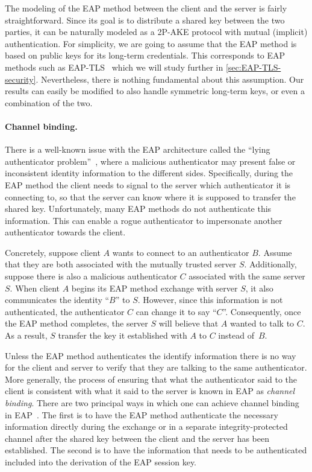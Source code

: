The modeling of the EAP method between the client and the server is fairly straightforward.
Since its goal is to distribute a shared key between the two parties,
it can be naturally modeled as a 2P-AKE protocol with mutual (implicit) authentication.
For simplicity,
we are going to assume that the EAP method is based on public keys for its long-term credentials.
This corresponds to EAP methods such as EAP-TLS~\cite{IETF:RFC5216:EAP-TLS} which we will study further in \cref{sec:EAP-TLS-security}.
Nevertheless,
there is nothing fundamental about this assumption.
Our results can easily be modified to also handle symmetric long-term keys,
or even a combination of the two.


\paragraph{Channel binding.}
There is a well-known issue with the EAP architecture called the ``lying authenticator problem''~\cite[Section~7.15]{IETF:RFC3748:EAP},
where a malicious authenticator may present false or inconsistent identity information to the different sides. 
Specifically,
during the EAP method the client needs to signal to the server which authenticator it is connecting to,
so that the server can know where it is supposed to transfer the shared key.
Unfortunately,
many EAP methods do not authenticate this information.
This can enable a rogue authenticator to impersonate another authenticator towards the client.

Concretely,
suppose client $A$ wants to connect to an authenticator $B$.
Assume that they are both associated with the mutually trusted server $S$.
Additionally,
suppose there is also a malicious authenticator $C$ associated with the same server $S$.
When client $A$ begins its EAP method exchange with server $S$,
it also communicates the identity ``$B$'' to $S$.
However,
since this information is not authenticated,
the authenticator $C$ can change it to say ``$C$''.
Consequently,
once the EAP method completes,
the server $S$ will believe that $A$ wanted to talk to $C$.
As a result,
$S$ transfer the key it established with $A$ to $C$ instead of~$B$.



Unless the EAP method authenticates the identify information there is no way for the client and server to verify that they are talking to the same authenticator.
More generally,
the process of ensuring that what the authenticator said to the client is consistent with what it said to the server is known in EAP as \emph{channel binding}.
There are two principal ways in which one can  achieve channel binding in EAP~\cite[Section~4.1]{IETF:RFC6677:EAP-channel-binding}.
The first is to have the EAP method authenticate the necessary information directly during the exchange
or in a separate integrity-protected channel after the shared key between the client and the server has been established. 
The second is to have the information that needs to be authenticated included into the derivation of the EAP session key.

